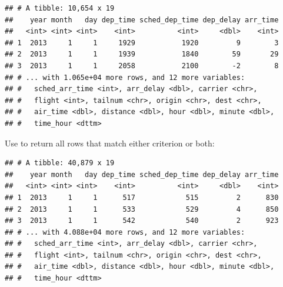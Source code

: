 \documentclass[]{book}
\newenvironment{Shaded}{}{}
\newcommand{\DecValTok}[1]{#1}
\newcommand{\KeywordTok}[1]{\textcolor[rgb]{0.00,0.00,1.00}{#1}}
\newcommand{\NormalTok}[1]{#1}
\newcommand{\OperatorTok}[1]{#1}
\newcommand{\StringTok}[1]{\textcolor[rgb]{0.00,0.50,0.50}{#1}}
\begin{document}
\begin{Shaded}
\end{Shaded}

\begin{verbatim}
## # A tibble: 10,654 x 19
##    year month   day dep_time sched_dep_time dep_delay arr_time
##   <int> <int> <int>    <int>          <int>     <dbl>    <int>
## 1  2013     1     1     1929           1920         9        3
## 2  2013     1     1     1939           1840        59       29
## 3  2013     1     1     2058           2100        -2        8
## # ... with 1.065e+04 more rows, and 12 more variables:
## #   sched_arr_time <int>, arr_delay <dbl>, carrier <chr>,
## #   flight <int>, tailnum <chr>, origin <chr>, dest <chr>,
## #   air_time <dbl>, distance <dbl>, hour <dbl>, minute <dbl>,
## #   time_hour <dttm>
\end{verbatim}

Use \texttt{\textbar{}} to return all rows that match either criterion or both:

\begin{Shaded}
\end{Shaded}

\begin{verbatim}
## # A tibble: 40,879 x 19
##    year month   day dep_time sched_dep_time dep_delay arr_time
##   <int> <int> <int>    <int>          <int>     <dbl>    <int>
## 1  2013     1     1      517            515         2      830
## 2  2013     1     1      533            529         4      850
## 3  2013     1     1      542            540         2      923
## # ... with 4.088e+04 more rows, and 12 more variables:
## #   sched_arr_time <int>, arr_delay <dbl>, carrier <chr>,
## #   flight <int>, tailnum <chr>, origin <chr>, dest <chr>,
## #   air_time <dbl>, distance <dbl>, hour <dbl>, minute <dbl>,
## #   time_hour <dttm>
\end{verbatim}
\end{document}
